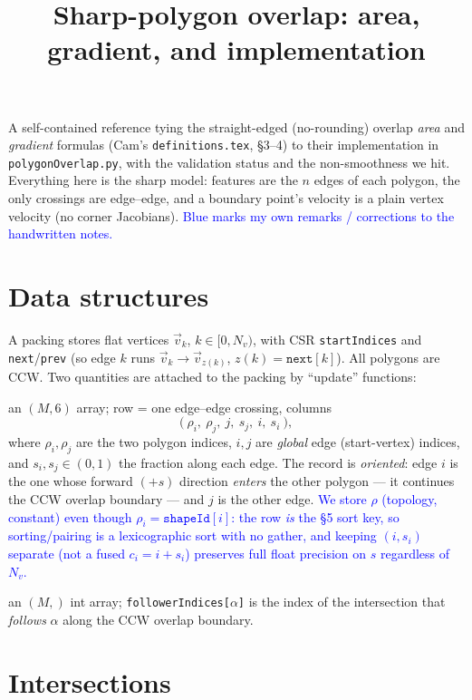 \documentclass[11pt]{article}
\title{Sharp-polygon overlap: area, gradient, and implementation}
\author{}
\date{}
\newcommand{\vv}[1]{\vec{#1}}
\newcommand{\code}[1]{\texttt{#1}}
\newcommand{\note}[1]{\textcolor{blue}{#1}}
\begin{document}
\maketitle

\noindent
A self-contained reference tying the straight-edged (no-rounding) overlap \emph{area} and
\emph{gradient} formulas (Cam's \texttt{definitions.tex}, \S3--4) to their implementation in
\code{polygonOverlap.py}, with the validation status and the non-smoothness we hit. Everything here
is the sharp model: features are the $n$ edges of each polygon, the only crossings are edge--edge,
and a boundary point's velocity is a plain vertex velocity (no corner Jacobians). \note{Blue marks
my own remarks / corrections to the handwritten notes.}

\section{Data structures}

A packing stores flat vertices $\vv v_k$, $k\in[0,N_v)$, with CSR \code{startIndices} and
\code{next}/\code{prev} (so edge $k$ runs $\vv v_k\to\vv v_{z(k)}$, $z(k)=\code{next}[k]$). All
polygons are CCW. Two quantities are attached to the packing by ``update'' functions:

\begin{description}[leftmargin=1.5em]
\item[\code{packing.intersections}] an $(M,6)$ array; row = one edge--edge crossing, columns
\[
  \big(\ \rho_i,\ \rho_j,\ j,\ s_j,\ i,\ s_i\ \big),
\]
where $\rho_i,\rho_j$ are the two polygon indices, $i,j$ are \emph{global} edge (start-vertex)
indices, and $s_i,s_j\in(0,1)$ the fraction along each edge. The record is \emph{oriented}: edge $i$
is the one whose forward $(+s)$ direction \emph{enters} the other polygon --- it continues the CCW
overlap boundary --- and $j$ is the other edge. \note{We store $\rho$ (topology, constant) even
though $\rho_i=\code{shapeId}[i]$: the row \emph{is} the \S5 sort key, so sorting/pairing is a
lexicographic sort with no gather, and keeping $(i,s_i)$ separate (not a fused $c_i=i+s_i$) preserves
full float precision on $s$ regardless of $N_v$.}
\item[\code{packing.followerIndices}] an $(M,)$ int array; \code{followerIndices[$\alpha$]} is the
index of the intersection that \emph{follows} $\alpha$ along the CCW overlap boundary.
\end{description}

\section{Intersections}
\end{document}
